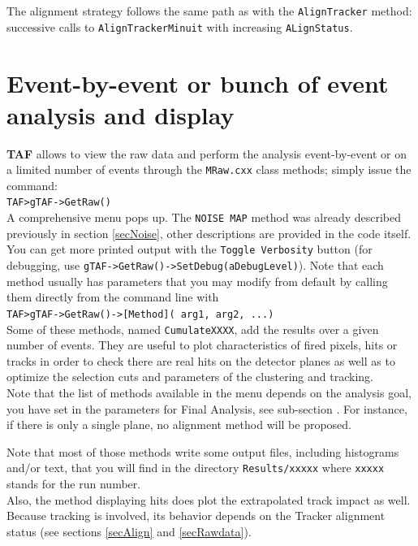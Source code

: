 \documentclass[a4paper, 12pt, twoside]{article}
\newcommand{\TAF}{{\bf TAF }}
\begin{document}
\noindent
The alignment strategy follows the same path as with the {\tt AlignTracker} method: successive calls to {\tt AlignTrackerMinuit} with increasing {\tt ALignStatus}. 


\vspace{2cm}

\section{Event-by-event or bunch of event analysis and display}
\label{secEbyE}

\TAF allows to view the raw data and perform the analysis event-by-event or on a limited number of events through the {\tt MRaw.cxx} class methods; simply issue the command:\\
{\tt TAF>gTAF->GetRaw()}\\

\noindent
A comprehensive menu pops up. The {\tt NOISE MAP} method was already described previously in section \ref{secNoise}, other descriptions are provided in the code itself. You can get more printed output with the {\tt Toggle Verbosity} button (for debugging, use {\tt gTAF->GetRaw()->SetDebug(aDebugLevel)}). Note that each method usually has parameters that you may modify from default by calling them directly from the command line with\\
{\tt TAF>gTAF->GetRaw()->[Method]( arg1, arg2, ...)}\\

\noindent
Some of these methods, named {\tt CumulateXXXX}, add the results over a given number of events. They are useful to plot characteristics of fired pixels, hits or tracks in order to check there are real hits on the detector planes as well as to optimize the selection cuts and parameters of the clustering and tracking.\\

\noindent
Note that the list of methods available in the menu depends on the analysis goal, you have set in the parameters for Final Analysis, see sub-section \label{subsec:paramFinalAnalysis}. For instance, if there is only a single plane, no alignment method will be proposed.

\noindent
Note that most of those methods write some output files, including histograms and/or text, that you will find in the directory {\tt Results/xxxxx} where {\tt xxxxx} stands for the run number.\\
Also, the method displaying hits does plot the extrapolated track impact as well. Because tracking is involved, its behavior depends on the Tracker alignment status (see sections \ref{secAlign} and \ref{secRawdata}).\\
\end{document}
